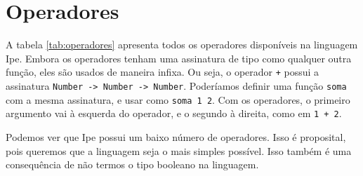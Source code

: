 \section{Operadores}

A tabela \autoref{tab:operadores} apresenta todos os operadores disponíveis na
linguagem Ipe. Embora os operadores tenham uma assinatura de tipo como qualquer
outra função, eles são usados de maneira infixa. Ou seja, o operador \texttt{+}
possui a assinatura \texttt{Number -> Number -> Number}. Poderíamos definir uma
função \texttt{soma} com a mesma assinatura, e usar como \texttt{soma 1 2}. Com
os operadores, o primeiro argumento vai à esquerda do operador, e o segundo à direita,
como em \texttt{1 + 2}.

\begin{table}[htb]
    \caption[Operadores em Ipe]{Operadores em Ipe}
    \label{tab:operadores}
\end{table}

Podemos ver que Ipe possui um baixo número de operadores. Isso é proposital, pois
queremos que a linguagem seja o mais simples possível. Isso também é uma consequência
de não termos o tipo booleano na linguagem.

